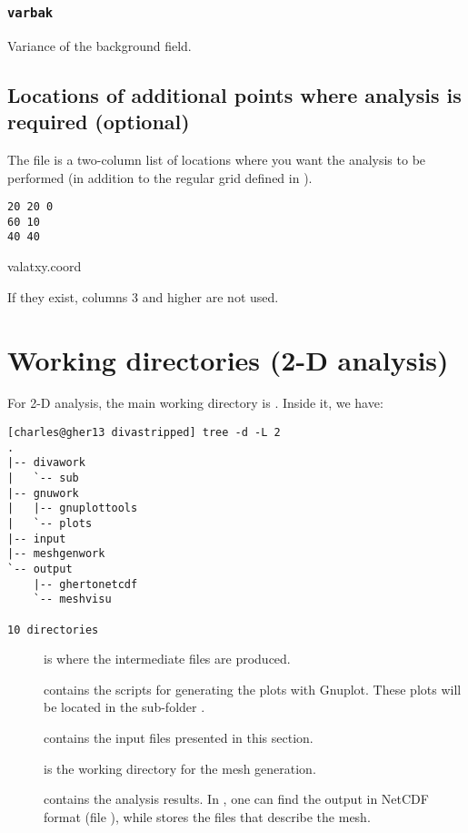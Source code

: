 \subsubsection{\texttt{varbak}}

Variance of the background field. 

\subsection[Additional points of analysis]{Locations of additional points where analysis is required (optional)}

The file  is a two-column list of locations where you want the analysis to be performed (in addition to the regular grid defined in ).  

\begin{exfile}[htpb]
\begin{footnotesize}
\texttt{20 20 0\\
60 10\\
40 40} 
\end{footnotesize}
\caption{valatxy.coord\label{ex:valatxy}}
\end{exfile}

If they exist, columns 3 and higher are not used.


\section{Working directories (2-D analysis)}

For 2-D analysis, the main working directory is . Inside it, we have:
\begin{lstlisting}[style=Bash]
[charles@gher13 divastripped] tree -d -L 2
.
|-- divawork
|   `-- sub
|-- gnuwork
|   |-- gnuplottools
|   `-- plots
|-- input
|-- meshgenwork
`-- output
    |-- ghertonetcdf
    `-- meshvisu

10 directories
\end{lstlisting}


\begin{description}

\item[] is where the intermediate files are produced.
\item[] contains the scripts for generating the plots with Gnuplot. These plots will be located in the sub-folder .
\item[] contains the input files presented in this section.
\item[] is the working directory for the mesh generation.
\item[] contains the analysis results. In , one can find the output in NetCDF format (file ), while  stores the files that describe the mesh.
\end{description}
